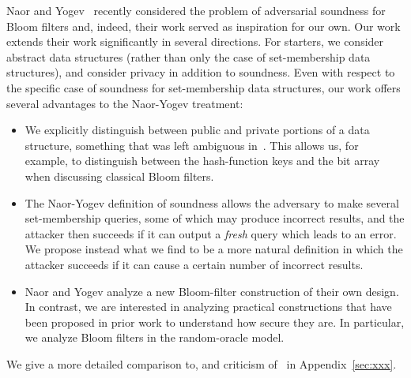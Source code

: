  Naor and
Yogev~\cite{naor2015bloom} recently considered the problem of
adversarial soundness for Bloom filters and, indeed,
their work served as inspiration for our own. Our work extends
their work significantly in several directions. For starters, we
consider abstract data structures (rather than only the case of
set-membership data structures), and consider privacy in addition to
soundness. Even with respect to the specific case of soundness for
set-membership data structures, our work offers several advantages
to the Naor-Yogev treatment:
\begin{itemize}
\item We explicitly distinguish between public and private
    portions of a data structure, something that was left
    ambiguous in~\cite{naor2015bloom}. This allows us, for
    example, to distinguish between the hash-function keys and
    the bit array when discussing classical Bloom filters.
\item The Naor-Yogev definition of soundness allows the
    adversary to make several set-membership queries, some of
    which may produce incorrect results, and the attacker then
    succeeds if it can output a \emph{fresh} query which leads
    to an error. We propose instead what we find to be a more
    natural definition in which the attacker succeeds if it can
    cause a certain number of incorrect results.
\item Naor and Yogev analyze a new Bloom-filter construction of
    their own design. In contrast, we are interested in
    analyzing practical constructions that have been proposed in
    prior work to understand how secure they are. In particular,
    we analyze Bloom filters in the random-oracle model.
\end{itemize}
We give a more detailed comparison to, and criticism
of~\cite{naor2015bloom} in Appendix~\ref{sec:xxx}. 


